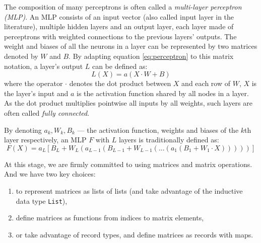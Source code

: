\documentclass[runningheads]{llncs}
\begin{document}
The composition of many perceptrons is often called a \emph{multi-layer perceptron (MLP)}.
An MLP consists of an input vector (also called input layer in the literature),
multiple hidden layers and an output layer, each layer 
made of perceptrons with weighted connections to the previous layers' outputs. %
The weight and biases of all the neurons in a layer can be represented by two matrices denoted by $W$ and $B$. By adapting equation \ref{eq:perceptron} to this matrix notation, a layer's output $L$ can be defined as:
\begin{equation}
	L(X) = a(X \cdot W + B)
\end{equation}
where the operator $\cdot $ denotes the dot product between $X$ and each row of $W$, %
$X$ is the layer's input and $a$ is the activation function shared by all nodes in a layer. %
As the dot product multiplies pointwise all inputs by all weights, such layers are often called \emph{fully connected}. %

By denoting $a_k, W_k, B_k$ --- the activation function, weights and biases of the $k$th layer respectively, an MLP $F$ with $L$ layers is traditionally defined as:
\begin{equation}
	F(X) = a_L[B_L + W_L (a_{L-1}(B_{L-1} + W_{L-1}(...(a_1(B_1+W_1\cdot X)))))]
      \end{equation}

      At this stage, we are firmly committed to using matrices and matrix operations. And we have two key choices:
\begin{enumerate}
\item to represent matrices as lists of lists (and take advantage of the inductive data type \lstinline{List}),
\item define matrices as functions from indices to matrix elements,
\item or take advantage of record types, and define matrices as records with maps.  
\end{enumerate}
\end{document}
